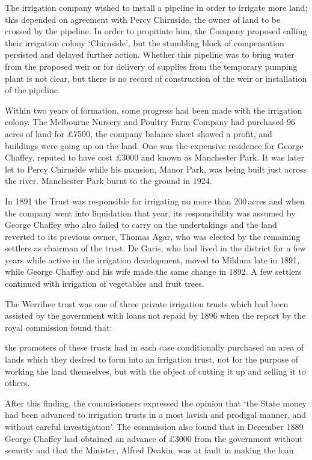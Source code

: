 The irrigation company wished to install a
pipeline in order to irrigate
more land; this depended on agreement with Percy Chirnside,
the owner of land to be crossed by the pipeline.  In order to
propitiate him, the Company proposed calling their irrigation colony
`Chirnside', but the stumbling block of compensation persisted and
delayed further action.  Whether this pipeline was to bring water from
the proposed weir or for delivery of supplies from the temporary
pumping plant is not clear, but there is no record of construction of
the weir or installation of the pipeline.

Within two years of formation, some progress had been made with the
irrigation colony.  The Melbourne Nursery and Poultry Farm Company
 had
purchased 96\,acres of land for \pounds7500, the company balance sheet
showed a profit, and buildings were going up on the land.  One was the
expensive residence for George Chaffey, reputed to have cost
\pounds3000 and known as Manchester Park.  It was later let to 
Percy Chirnside while his mansion, Manor Park, was being built just
across the river.  Manchester Park burnt to the ground in
1924.

In 1891 the Trust was responsible for irrigating no more than
200\,acres and when the company went into liquidation that year, its
responsibility was assumed by George Chaffey who also failed to carry
on the undertakings and the land reverted to its previous owner,
Thomas Agar,  who was elected by the remaining
settlers as chairman of the trust.  De Garis, who had lived in the
district for a few years while active in the irrigation development,
moved to Mildura late in 1891, while George Chaffey and his wife made
the same change in 1892.  A few settlers continued with irrigation of
vegetables and fruit
trees.

The Werribee trust was one of three private irrigation trusts which
had been assisted by the government with loans not repaid by 1896 when
the report by the royal commission found that:
\begin{Quote}
	the promoters of these trusts had in each case conditionally
	purchased an area of lands which they desired to form into an
	irrigation trust, not for the purpose of working the land
	themselves, but with the object of cutting it up and selling
	it to others.
\end{Quote}
After this finding, the commissioners expressed the opinion that `the
State money had been advanced to irrigation trusts in a most lavish
and prodigal manner, and without careful investigation'. The
commission also found that in December 1889 George Chaffey had
obtained an advance of \pounds3000 from the government without
security and that the Minister, Alfred Deakin, was at fault in making
the loan.

